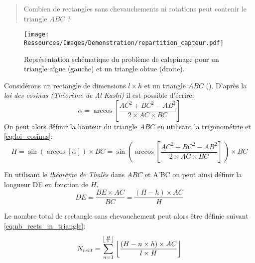 
\blockquote{Combien de rectangles sans chevauchements ni rotations peut contenir le triangle $ABC$ ?}

\begin{figure}
    \centering
    \texttt{[image: Ressources/Images/Demonstration/repartition\_capteur.pdf]}
    \caption[Représentation schématique du problème de calepinage]
            {Représentation schématique du problème de calepinage pour
             un triangle aïgue (gauche) et un triangle obtue (droite).
             \label{fig:rects_in_triangle}}
\end{figure}

Considérons un rectangle de dimensions $l \times h$ et un triangle $ABC$ ().
D’après la \textit{loi des cosinus (Théorême de Al Kashi)} il est possible d’écrire:
\begin{equation}
        \alpha = \arccos \left[\frac{AC^{2} + BC^{2} - AB^{2}}{2 \times AC \times BC}\right]
    \label{eq:loi_cosinus}
\end{equation}
\noindent On peut alors définir la hauteur du triangle $ABC$ en utilisant la trigonométrie et
\eqref{eq:loi_cosinus}:
\begin{equation}
        H = \sin (\arccos[\alpha]) \times BC%
          =\sin \left(\arccos \left[\frac{AC^{2} + BC^{2} - AB^{2}}{2 \times AC \times BC}\right]\,\right) \times BC
    \label{fig:height_triangle}
\end{equation}

\noindent En utilisant le \textit{théorême de Thalès} dans $ABC$ et A’BC on peut ainsi définir la longueur DE
en fonction de $H$.
\begin{equation}
    DE = \frac{BE \times AC}{BC} = \frac{(H - h) \times AC}{H}
\end{equation}

\noindent Le nombre total de rectangle sans chevauchement peut alors être définie suivant \eqref{eq:nb_rects_in_triangle}:
\begin{equation}
    N_{rect} = \sum_{n = 1}^{\floor*{\frac{H}{h}}} \, \floor*{\frac{(H - n \times h) \times AC}{l \times H}}
    \label{eq:nb_rects_in_triangle}
\end{equation}
